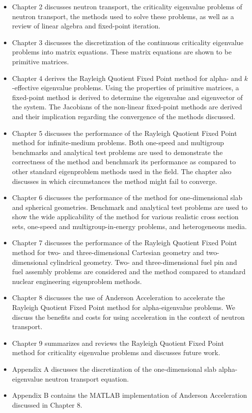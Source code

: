\begin{itemize}
	\item Chapter 2 discusses neutron transport, the criticality eigenvalue problems of neutron transport, the methods used to solve these problems, as well as a review of linear algebra and fixed-point iteration.
	\item Chapter 3 discusses the discretization of the continuous criticality eigenvalue problems into matrix equations. These matrix equations are shown to be primitive matrices.
	\item Chapter 4 derives the Rayleigh Quotient Fixed Point method for alpha- and $k$-effective eigenvalue problems. Using the properties of primitive matrices, a fixed-point method is derived to determine the eigenvalue and eigenvector of the system. The Jacobians of the non-linear fixed-point methods are derived and their implication regarding the convergence of the methods discussed.
	\item Chapter 5 discusses the performance of the Rayleigh Quotient Fixed Point method for infinite-medium problems. Both one-speed and multigroup benchmarks and analytical test problems are used to demonstrate the correctness of the method and benchmark its performance as compared to other standard eigenproblem methods used in the field. The chapter also discusses in which circumstances the method might fail to converge.
	\item Chapter 6 discusses the performance of the method for one-dimensional slab and spherical geometries. Benchmark and analytical test problems are used to show the wide applicability of the method for various realistic cross section sets, one-speed and multigroup-in-energy problems, and heterogeneous media.
	\item Chapter 7 discusses the performance of the Rayleigh Quotient Fixed Point method for two- and three-dimensional Cartesian geometry and two-dimensional cylindrical geometry. Two- and three-dimensional fuel pin and fuel assembly problems are considered and the method compared to standard nuclear engineering eigenproblem methods.
	\item Chapter 8 discusses the use of Anderson Acceleration to accelerate the Rayleigh Quotient Fixed Point method for alpha-eigenvalue problems. We discuss the benefits and costs for using acceleration in the context of neutron transport.
	\item Chapter 9 summarizes and reviews the Rayleigh Quotient Fixed Point method for criticality eigenvalue problems and discusses future work.
	\item Appendix A discusses the discretization of the one-dimensional slab alpha-eigenvalue neutron transport equation.
	\item Appendix B contains the MATLAB implementation of Anderson Acceleration discussed in Chapter 8.
\end{itemize}

